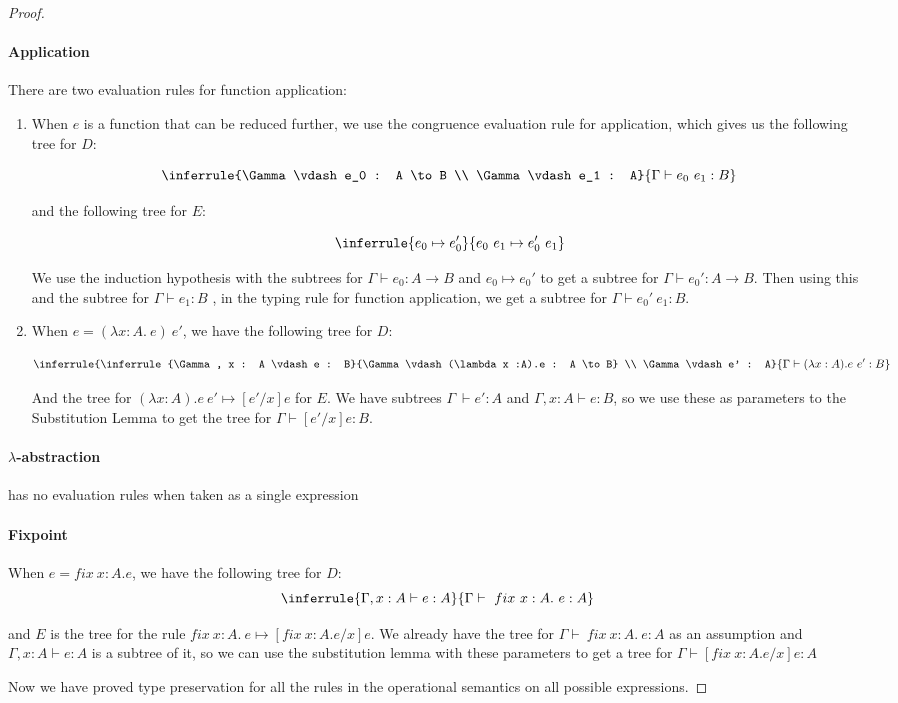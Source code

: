 \begin{proof}
\paragraph{Application} There are two evaluation rules for function application:
\begin{enumerate}
\item{When $e$ is a function that can be reduced further, we use the congruence evaluation rule for application, which gives us the following tree for $D$:

$$
\inferrule{\Gamma \vdash e_0 : A \to B \\  \Gamma \vdash e_1 : A}
  {\Gamma \vdash e_0 \ e_1 : B}
$$  

and the following tree for $E$:

$$
\inferrule {e_0 \mapsto e_0'} {e_0 \ e_1 \mapsto e_0' \ e_1}
$$

We use the induction hypothesis with the subtrees for $\Gamma \vdash e_0 : A \to B$ and $e_0 \mapsto e_0'$ to get a subtree for $\Gamma \vdash e_0' : A \to B$. Then using this and the subtree for $\Gamma \vdash e_1 : B$ , in the typing rule for function application, we get a subtree for $\Gamma \vdash e_0' \ e_1 : B$. }
\item{When $e = (\lambda x: A .\ e) \ e'$, we have the following tree for $D$:

$$
\inferrule{\inferrule{\Gamma, x : A \vdash e : B}{\Gamma \vdash (\lambda x :A).e : A \to B} \\  \Gamma \vdash e' : A}
  {\Gamma \vdash (\lambda x :A).e \ e' : B}
$$  

And the tree for $(\lambda x :A).e \ e' \mapsto [e'/x]e$ for $E$. We have subtrees $\Gamma \ \vdash e' : A$ and $\Gamma, x : A \vdash e : B$, so we use these as parameters to the Substitution Lemma to get the tree for $\Gamma \vdash [e'/x]e : B$.}
\end{enumerate}

\paragraph{$\lambda$-abstraction} has no evaluation rules when taken as a single expression

\paragraph{Fixpoint}
When $e = fix \ x:A. e$, we have the following tree for $D$:
$$
\inferrule{\Gamma, x : A \vdash e : A }
  {\Gamma \vdash \  fix \ x:A . \ e : A}
$$

and $E$ is the tree for the rule $fix \ x:A . \ e \mapsto [fix \ x:A. e/x]e$. We already have the tree for $\Gamma \vdash \  fix \ x:A . \ e : A$ as an assumption and $ \Gamma, x : A \vdash e : A$ is a subtree of it, so we can use the substitution lemma with these parameters to get a tree for $\Gamma \vdash [fix \ x:A . e/x]e :  A$

\vspace{1cm}

Now we have proved type preservation for all the rules in the operational semantics on all possible expressions.
\end{proof}

